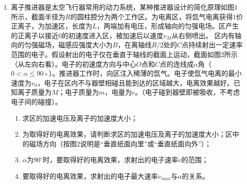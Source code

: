 \begin{enumerate}[leftmargin=0em]
\newpage
\item
{}
离子推进器是太空飞行器常用的动力系统，某种推进器设计的简化原理如图$ 1 $所示，截面半径为$ R $的圆柱腔分为两个工作区。为电离区，将氙气电离获得$ 1 $价正离子，为加速区，长度为$ L $，两端加有电压，形成轴向的匀强电场。区产生的正离子以接近$ 0 $的初速度进入区，被加速后以速度$ v_{M} $从右侧喷出。 
区内有轴向的匀强磁场，磁感应强度大小为$ B $，在离轴线$ R/2 $处的$ C $点持续射出一定速率范围的电子。假设射出的电子仅在垂直于轴线的截面上运动，截面如图$ 2 $所示（从左向右看）。电子的初速度方向与中心$ O $点和$ C $点的连线成$ \alpha $角（$ 0 < \alpha \leq 90 $◦）。推进器工作时，向区注入稀薄的氙气。电子使氙气电离的最小速度为$ v_{0} $，电子在区内不与器壁相碰且能到达的区域越大，电离效果越好。已知离子质量为$ M $；电子质量为$ m $，电量为$ e $。（电子碰到器壁即被吸收，不考虑电子间的碰撞）。
\begin{enumerate}
\renewcommand{\labelenumi}{\arabic{enumi}.}
\item
求区的加速电压及离子的加速度大小；
\item 
为取得好的电离效果，请判断求区的加速电压及离子的加速度大小；区中的磁场方向（按图$ 2 $说明是“垂直纸面向里”或“垂直纸面向外”）；
\item 
$ \alpha $为$ 90 ^{\circ} $时，要取得好的电离效果，求射出的电子速率$ v $的范围；
\item 
要取得好的电离效果，求射出的电子最大速率$ v_{max} $与$ \alpha $的关系。



\end{enumerate}
\begin{figure}[h!]
\flushright

\end{figure}

\end{enumerate}
